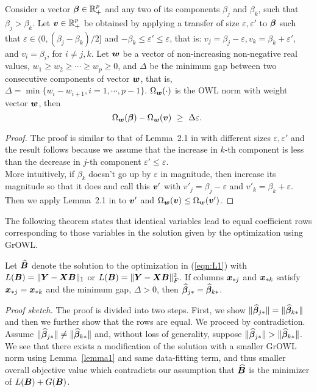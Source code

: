 \begin{lemma}\label{lemma1}
Consider a vector $\boldsymbol{\beta} \in {\mathbb R}^p_+$ and any two of its components $\beta_j$ and $\beta_k$, such that $\beta_j > \beta_k$. Let $\boldsymbol{v} \in {\mathbb R}^p_+$ be obtained by applying a transfer of size $\varepsilon, \varepsilon'$ to $\boldsymbol{\beta}$ such that $\varepsilon \in (0, (\beta_j - \beta_k )/2]$ and $ -\beta_k \leq \varepsilon' \leq \varepsilon$, that is: $v_j = \beta_j - \varepsilon, v_k = \beta_k + \varepsilon'$, and $v_i = \beta_i$, for $i \neq j, k$. Let $\boldsymbol{w}$ be a vector of non-increasing non-negative real values, $w_1 \geq w_2 \geq \cdots \geq w_p \geq 0$, and $\Delta$ be the minimum gap between two consecutive components of vector
$\boldsymbol{w}$, that is, $\Delta = \min\{w_i - w_{i+1}, i = 1, \cdots, p - 1\}$. $\Omega_{\boldsymbol{w}}(\cdot)$ is the OWL norm with weight vector $\boldsymbol{w}$, then
$$\Omega_{\bw}(\bbeta) - \Omega_{\bw}(\bv) \ \geq \ \Delta \varepsilon. \ $$
\end{lemma}

\begin{proof}
The proof is similar to that of Lemma~2.1 in \citep{owl} with different sizes $\varepsilon, \varepsilon'$ and the result follows because we assume that the increase in $k$-th component is less than the decrease in $j$-th component \ie $\varepsilon' \leq \varepsilon$.\\
More intuitively, if $\beta_k$ doesn't go up by $\varepsilon$ in magnitude, then increase its magnitude so that it does and call this $\boldsymbol{v}'$ with $v'_j = \beta_j - \varepsilon$ and $v'_k = \beta_k + \varepsilon$.  Then we apply Lemma~2.1 in \citep{owl} to $\boldsymbol{v}'$ and $\Omega_{\boldsymbol{w}}(\boldsymbol{v}) \leq \Omega_{\boldsymbol{w}}(\boldsymbol{v}')$. 
\end{proof}

The following theorem states that identical variables lead to equal coefficient rows corresponding to those variables in the solution given by the optimization using GrOWL.

\begin{theorem}\label{ident1}
Let $\widehat {\boldsymbol{B}}$ denote the solution to the optimization in (\ref{eqn:L1}) with $L(\boldsymbol{B}) = \|\boldsymbol{Y} - \boldsymbol{X} \boldsymbol{B} \|_1$ or $L(\boldsymbol{B}) = \|\boldsymbol{Y} - \boldsymbol{X} \boldsymbol{B} \|_F^2$.
If columns $\boldsymbol{x}_{{\ast} j}$ and $\boldsymbol{x}_{{\ast} k}$ satisfy $\boldsymbol{x}_{{\ast} j} = \boldsymbol{x}_{{\ast} k}$ and the minimum gap, $\Delta > 0$, then
$\widehat {\boldsymbol{\beta}}_{j {\ast}} = \widehat {\boldsymbol{\beta}}_{k {\ast}}$.
\end{theorem}

\textit{Proof sketch.}
The proof is divided into two steps. First, we show $\|\widehat {\boldsymbol{\beta}}_{j {\ast}}\| = \|\widehat {\boldsymbol{\beta}}_{k {\ast}}\|$ and then we further show that the rows are equal. 
We proceed by contradiction. Assume $\|\widehat {\boldsymbol{\beta}}_{j {\ast}}\| \neq \|\widehat {\boldsymbol{\beta}}_{k {\ast}}\|$ and, without loss of generality, suppose $\|\widehat {\boldsymbol{\beta}}_{j {\ast}}\| > \|\widehat {\boldsymbol{\beta}}_{k {\ast}}\|$. We see that there exists a modification of the solution with a smaller GrOWL norm using Lemma~\ref{lemma1} and same data-fitting term, and thus smaller overall objective value which contradicts our assumption that $\widehat {\boldsymbol{B}}$ is the minimizer of $L(\boldsymbol{B}) + G(\boldsymbol{B})$. \\

